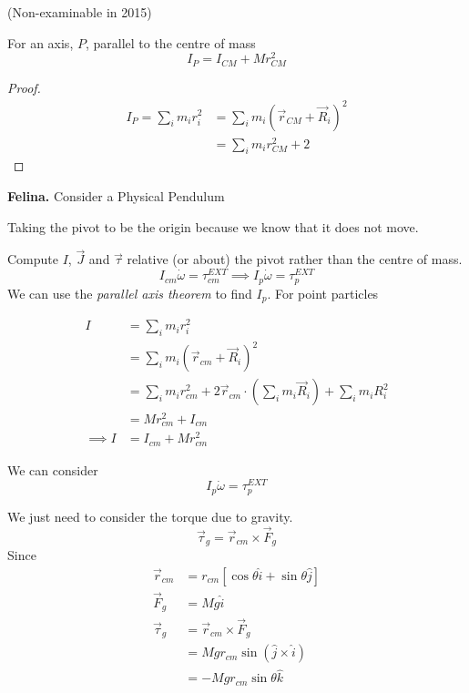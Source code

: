 \documentclass[10pt]{scrartcl}
\begin{document}
(Non-examinable in 2015)
\begin{theorem}
For an axis, $P$, parallel to the centre of mass	\[I_P = I_{CM} + Mr^2_{CM}\]
\end{theorem}
\begin{proof}
\[\begin{aligned}I_P = \sum_{i} m_ir_i^2 &= \sum_i m_i(\vec{r}_{CM} + \vec{R}_i)^2\\
&= \sum_i m_i r_{CM}^2 + 2	
\end{aligned}
\]
\end{proof}

\textbf{Felina.} Consider a Physical Pendulum
  \begin{center}
  \end{center}
  
 Taking the pivot to be the origin because we know that it does not move. 
 
 Compute $I$, $\vec{J}$ and $\vec{\tau}$ relative (or about) the pivot rather than the centre of mass. 
 \[I_{cm}\dot{\omega} = \tau_{cm}^{EXT} \implies I_p\dot{\omega} = \tau_p^{EXT}\]
 We can use the \emph{parallel axis theorem} to find $I_p$. For point particles
 
\[\begin{aligned}
I &= \sum_i m_ir_i^2\\
&= \sum_i m_i(\vec{r}_{cm} + \vec{R}_i)^2\\
&= \sum_i m_ir_{cm}^2 + 2\vec{r}_{cm}\cdot(\sum_im_i\vec{R}_i) + \sum_im_iR_i^2\\
&= Mr_{cm}^2 + I_{cm}\\
\implies I &= I_{cm} + Mr_{cm}^2
\end{aligned}
\]


We can consider 
\[I_p\dot{\omega} = \tau_p^{EXT}\]

We just need to consider the torque due to gravity. 
\[\vec{\tau}_g = \vec{r}_{cm} \times \vec{F}_g\]
Since 
\[
\begin{aligned}
\vec{r}_{cm} &= r_{cm}[\cos\theta\hat{i} + \sin\theta\hat{j}]\\
\vec{F}_g &= Mg\hat{i}\\
\vec{\tau}_g &= \vec{r}_{cm} \times \vec{F}_g\\
&= Mgr_{cm}\sin(\hat{j} \times \hat{i})\\
&= -Mgr_{cm}\sin\theta\hat{k}
\end{aligned}
\]
\end{document}
